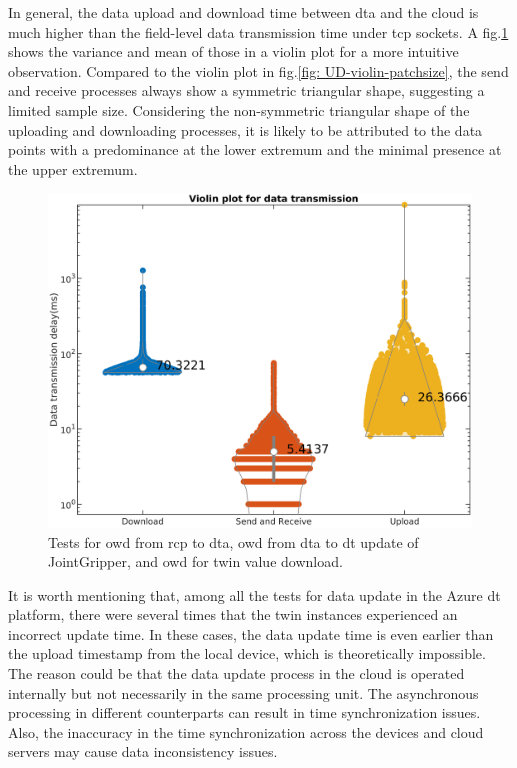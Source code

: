 In general, the data upload and download time between \gls{dta} and the cloud is 
much higher than the field-level data transmission time under \gls{tcp} sockets. 
A fig.\ref{fig: SR-U-D-violin} shows the variance and mean of those in a violin plot 
for a more intuitive observation. 
Compared to the violin plot in fig.\ref{fig: UD-violin-patchsize}, the send and receive 
processes always show a symmetric triangular shape, suggesting a limited sample size. 
Considering the non-symmetric triangular shape of the uploading and downloading processes, 
it is likely to be attributed to the data points with a predominance at the lower extremum 
and the minimal presence at the upper extremum.
\begin{figure}[htb]
    \centering
    \includegraphics[width=\textwidth]{figures/tests/DT/log_violin_Plot_3cat.png}
    \caption{Tests for \gls{owd} from \gls{rcp} to \gls{dta}, 
    \gls{owd} from \gls{dta} to \gls{dt} 
    update of JointGripper, and \gls{owd} for twin value download.\label{fig: SR-U-D-violin}} 
\end{figure}


It is worth mentioning that, among all the tests for data update 
in the Azure \gls{dt} platform, there were several times that the 
twin instances experienced an incorrect update time. In these cases, 
the data update time is even earlier than the upload timestamp from the 
local device, which is theoretically impossible. The reason could be 
that the data update process in the cloud is operated internally but not necessarily in 
the same processing unit. The asynchronous processing in different counterparts 
can result in time synchronization issues. Also, the inaccuracy in the 
time synchronization across the devices and cloud servers may cause data 
inconsistency issues.



